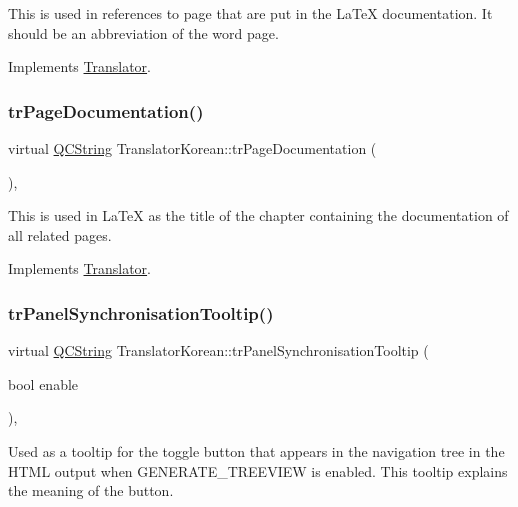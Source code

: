 This is used in references to page that are put in the La\+TeX documentation. It should be an abbreviation of the word page. 

Implements \mbox{\hyperlink{class_translator}{Translator}}.

\mbox{\label{class_translator_korean_ad9390b10624de48634ae69d0cf911a6d}} 
\subsubsection{\texorpdfstring{trPageDocumentation()}{trPageDocumentation()}}
{\footnotesize\ttfamily virtual \mbox{\hyperlink{class_q_c_string}{Q\+C\+String}} Translator\+Korean\+::tr\+Page\+Documentation (\begin{DoxyParamCaption}{ }\end{DoxyParamCaption})\hspace{0.3cm}{\ttfamily [inline]}, {\ttfamily [virtual]}}

This is used in La\+TeX as the title of the chapter containing the documentation of all related pages. 

Implements \mbox{\hyperlink{class_translator}{Translator}}.

\mbox{\label{class_translator_korean_a446b002d4dd72752c0999337b1393ef1}} 
\subsubsection{\texorpdfstring{trPanelSynchronisationTooltip()}{trPanelSynchronisationTooltip()}}
{\footnotesize\ttfamily virtual \mbox{\hyperlink{class_q_c_string}{Q\+C\+String}} Translator\+Korean\+::tr\+Panel\+Synchronisation\+Tooltip (\begin{DoxyParamCaption}\item[{bool}]{enable }\end{DoxyParamCaption})\hspace{0.3cm}{\ttfamily [inline]}, {\ttfamily [virtual]}}

Used as a tooltip for the toggle button that appears in the navigation tree in the H\+T\+ML output when G\+E\+N\+E\+R\+A\+T\+E\+\_\+\+T\+R\+E\+E\+V\+I\+EW is enabled. This tooltip explains the meaning of the button. 

